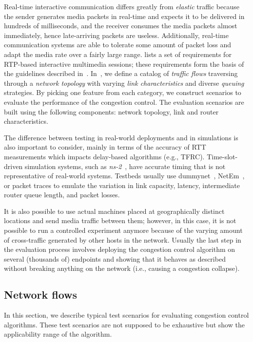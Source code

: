 Real-time interactive communication differs greatly from \emph{elastic}
traffic because the sender generates media packets in real-time and expects it
to be delivered in hundreds of milliseconds, and the receiver consumes the media
packets almost immediately, hence late-arriving packets are useless.
Additionally, real-time communication systems are able to tolerate some amount
of packet loss and adapt the media rate over a fairly large range.
\cite{draft.rmcat.req} lists a set of requirements for RTP-based interactive
multimedia sessions; these requirements form the basis of the guidelines
described in~\cite{draft.rmcat.evaluate}. In~\cite{draft.rmcat.eval.test}, we
define a catalog of \emph{traffic flows} traversing through a \emph{network
topology} with varying \emph{link characteristics} and diverse \emph{queuing}
strategies. By picking one feature from each category, we
construct scenarios to evaluate the performance of the congestion control. The
evaluation scenarios are built using the following components: network
topology, link and router characteristics.

The difference between testing in real-world deployments and in simulations is
also important to consider, mainly in terms of the accuracy of RTT
measurements which impacts delay-based algorithms (e.g., TFRC). Time-slot-driven
simulation systems, such as \emph{ns-2}~\cite{ns2}, have accurate timing that
is not representative of real-world systems. Testbeds usually use
dummynet~\cite{Carbone:2010p3502}, NetEm~\cite{netem}, or packet traces to
emulate the variation in link capacity, latency, intermediate router queue
length, and packet losses. 

It is also possible to use actual machines placed at geographically distinct
locations and send media traffic between them; however, in this case, it is
not possible to run a controlled experiment anymore because of the varying
amount of cross-traffic generated by other hosts in the network.  Usually the
last step in the evaluation process involves deploying the congestion control
algorithm on several (thousands of) endpoints and showing that it behaves as
described without breaking anything on the network (i.e., causing a congestion
collapse).

\subsection{Network flows}

In this section, we describe typical test scenarios for evaluating congestion
control algorithms. These test scenarios are not supposed to be exhaustive
but show the applicability range of the algorithm.

